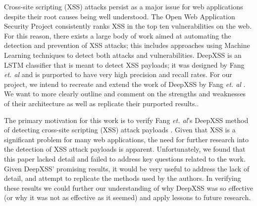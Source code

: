 Cross-site scripting (XSS) attacks persist as a major issue for web applications despite their root causes being well understood. The Open Web Application Security Project consistently ranks XSS in the top ten vulnerabilities on the web. For this reason, there exists a large body of work aimed at automating the detection and prevention of XSS attacks; this includes approaches using Machine Learning techniques to detect both attacks and vulnerabilities. DeepXSS is an LSTM classifier that is meant to detect XSS payloads; it was designed by Fang \textit{et. al} and is purported to have very high precision and recall rates. For our project, we intend to recreate and extend the work of DeepXSS by Fang \textit{et. al} \cite{fang2018deepxss}. We want to more clearly outline and comment on the strengths and weaknesses of their architecture as well as replicate their purported results.\cite{fang2018deepxss}. 

The primary motivation for this work is to verify Fang \textit{et. al}’s DeepXSS method of detecting cross-site scripting (XSS) attack payloads \cite{fang2018deepxss}. Given that XSS is a significant problem for many web applications, the need for further research into the detection of XSS attack payloads is apparent.  Unfortunately, we found that this paper lacked detail and failed to address key questions related to the work.  Given DeepXSS’ promising results, it would be very useful to address the lack of detail, and attempt to replicate the methods used by the authors.  In verifying these results we could further our understanding of why DeepXSS was so effective (or why it was not as effective as it seemed) and apply lessons to future research.